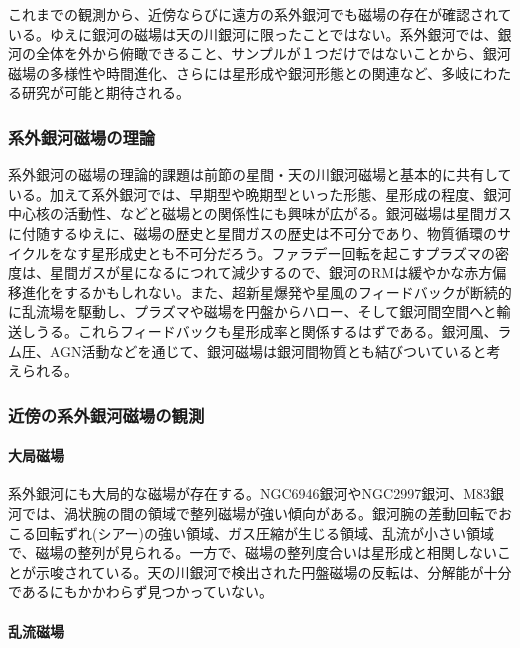 これまでの観測から、近傍ならびに遠方の系外銀河でも磁場の存在が確認されている。ゆえに銀河の磁場は天の川銀河に限ったことではない。系外銀河では、銀河の全体を外から俯瞰できること、サンプルが１つだけではないことから、銀河磁場の多様性や時間進化、さらには星形成や銀河形態との関連など、多岐にわたる研究が可能と期待される。

\subsubsection{系外銀河磁場の理論}
\label{c06.s1.ss3.sss2}

系外銀河の磁場の理論的課題は前節の星間・天の川銀河磁場と基本的に共有している。加えて系外銀河では、早期型や晩期型といった形態、星形成の程度、銀河中心核の活動性、などと磁場との関係性にも興味が広がる。銀河磁場は星間ガスに付随するゆえに、磁場の歴史と星間ガスの歴史は不可分であり、物質循環のサイクルをなす星形成史とも不可分だろう。ファラデー回転を起こすプラズマの密度は、星間ガスが星になるにつれて減少するので、銀河のRMは緩やかな赤方偏移進化をするかもしれない。また、超新星爆発や星風のフィードバックが断続的に乱流場を駆動し、プラズマや磁場を円盤からハロー、そして銀河間空間へと輸送しうる。これらフィードバックも星形成率と関係するはずである。銀河風、ラム圧、AGN活動などを通じて、銀河磁場は銀河間物質とも結びついていると考えられる。

\subsubsection{近傍の系外銀河磁場の観測}
\label{c06.s1.ss3.sss3}

\paragraph{大局磁場}

系外銀河にも大局的な磁場が存在する。NGC6946銀河やNGC2997銀河、M83銀河では、渦状腕の間の領域で整列磁場が強い傾向がある。銀河腕の差動回転でおこる回転ずれ(シアー)の強い領域、ガス圧縮が生じる領域、乱流が小さい領域で、磁場の整列が見られる。一方で、磁場の整列度合いは星形成と相関しないことが示唆されている。天の川銀河で検出された円盤磁場の反転\citep{2011ApJ...728...97V}は、分解能が十分であるにもかかわらず見つかっていない。

\paragraph{乱流磁場}

